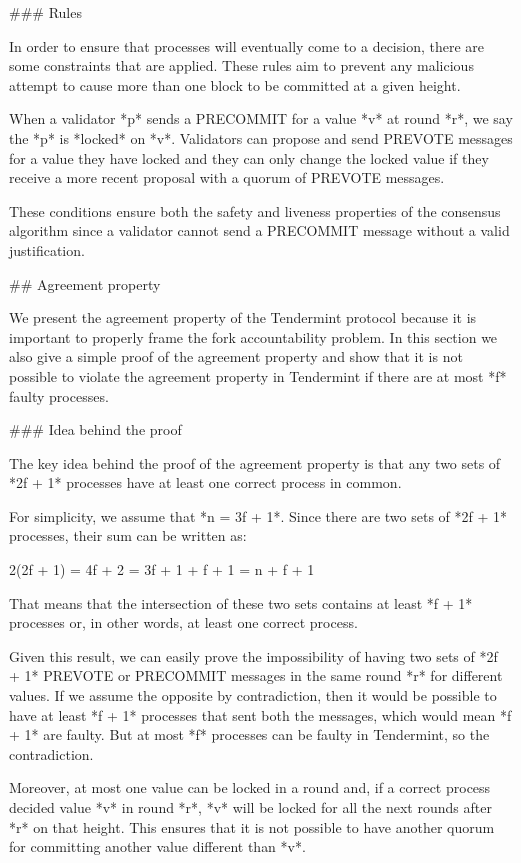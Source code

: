 \documentclass[a4paper,11pt,oneside]{report}
\begin{document}
\begin{markdown}

### Rules

In order to ensure that processes will eventually come to a decision, there are some constraints that are applied. These rules aim to prevent any malicious attempt to cause more than one block to be committed at a given height. 

When a validator *p* sends a PRECOMMIT for a value *v* at round *r*, we say the *p* is *locked* on *v*. Validators can propose and send PREVOTE messages for a value they have locked and they can only change the locked value if they receive a more recent proposal with a quorum of PREVOTE messages. 

These conditions ensure both the safety and liveness properties of the consensus algorithm since a validator cannot send a PRECOMMIT message without a valid justification.

## Agreement property

We present the agreement property of the Tendermint protocol because it is important to properly frame the fork accountability problem. In this section we also give a simple proof of the agreement property and show that it is not possible to violate the agreement property in Tendermint if there are at most *f* faulty processes.

### Idea behind the proof

The key idea behind the proof of the agreement property is that any two sets of *2f + 1* processes have at least one correct process in common.

For simplicity, we assume that *n = 3f + 1*.
Since there are two sets of *2f + 1* processes, their sum can be written as:
 
    2(2f + 1) = 4f + 2 = 3f + 1 + f + 1 = n + f + 1
     
That means that the intersection of these two sets contains at least *f + 1* processes or, in other words, at least one correct process.  

Given this result, we can easily prove the impossibility of having two sets of *2f + 1* PREVOTE or PRECOMMIT messages in the same round *r* for different values. If we assume the opposite by contradiction, then it would be possible to have at least *f + 1* processes that sent both the messages, which would mean *f + 1* are faulty. But at most *f* processes can be faulty in Tendermint, so the contradiction.

Moreover, at most one value can be locked in a round and, if a correct process decided value *v* in round *r*, *v* will be locked for all the next rounds after *r* on that height. This ensures that it is not possible to have another quorum for committing another value different than *v*.


\end{markdown}
\end{document}
